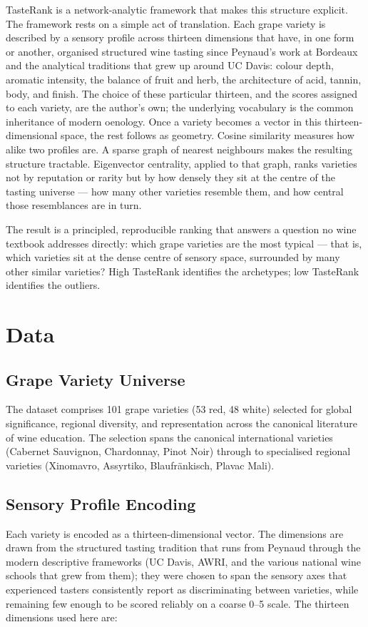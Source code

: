 \documentclass[11pt]{article}
\begin{document}
TasteRank is a network-analytic framework that makes this structure explicit. The framework rests on a simple act of translation. Each grape variety is described by a sensory profile across thirteen dimensions that have, in one form or another, organised structured wine tasting since Peynaud's work at Bordeaux and the analytical traditions that grew up around UC Davis: colour depth, aromatic intensity, the balance of fruit and herb, the architecture of acid, tannin, body, and finish. The choice of these particular thirteen, and the scores assigned to each variety, are the author's own; the underlying vocabulary is the common inheritance of modern oenology. Once a variety becomes a vector in this thirteen-dimensional space, the rest follows as geometry. Cosine similarity measures how alike two profiles are. A sparse graph of nearest neighbours makes the resulting structure tractable. Eigenvector centrality, applied to that graph, ranks varieties not by reputation or rarity but by how densely they sit at the centre of the tasting universe --- how many other varieties resemble them, and how central those resemblances are in turn.

The result is a principled, reproducible ranking that answers a question no wine textbook addresses directly: which grape varieties are the most typical --- that is, which varieties sit at the dense centre of sensory space, surrounded by many other similar varieties? High TasteRank identifies the archetypes; low TasteRank identifies the outliers.

\section{Data}

\subsection{Grape Variety Universe}
The dataset comprises 101 grape varieties (53 red, 48 white) selected for global significance, regional diversity, and representation across the canonical literature of wine education. The selection spans the canonical international varieties (Cabernet Sauvignon, Chardonnay, Pinot Noir) through to specialised regional varieties (Xinomavro, Assyrtiko, Blaufr\"ankisch, Plavac Mali).

\subsection{Sensory Profile Encoding}
Each variety is encoded as a thirteen-dimensional vector. The dimensions are drawn from the structured tasting tradition that runs from Peynaud through the modern descriptive frameworks (UC Davis, AWRI, and the various national wine schools that grew from them); they were chosen to span the sensory axes that experienced tasters consistently report as discriminating between varieties, while remaining few enough to be scored reliably on a coarse 0--5 scale. The thirteen dimensions used here are:
\end{document}
